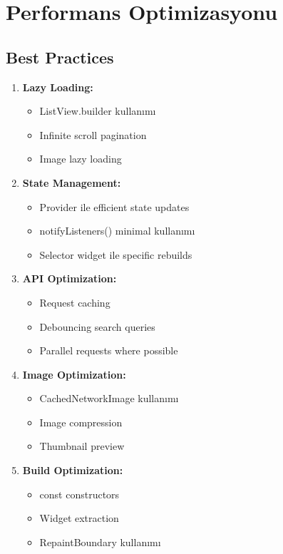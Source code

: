 \documentclass[12pt,a4paper]{article}
\begin{document}
\newpage

\section{Performans Optimizasyonu}

\subsection{Best Practices}

\begin{enumerate}
    \item \textbf{Lazy Loading:}
    \begin{itemize}
        \item ListView.builder kullanımı
        \item Infinite scroll pagination
        \item Image lazy loading
    \end{itemize}
    
    \item \textbf{State Management:}
    \begin{itemize}
        \item Provider ile efficient state updates
        \item notifyListeners() minimal kullanımı
        \item Selector widget ile specific rebuilds
    \end{itemize}
    
    \item \textbf{API Optimization:}
    \begin{itemize}
        \item Request caching
        \item Debouncing search queries
        \item Parallel requests where possible
    \end{itemize}
    
    \item \textbf{Image Optimization:}
    \begin{itemize}
        \item CachedNetworkImage kullanımı
        \item Image compression
        \item Thumbnail preview
    \end{itemize}
    
    \item \textbf{Build Optimization:}
    \begin{itemize}
        \item const constructors
        \item Widget extraction
        \item RepaintBoundary kullanımı
    \end{itemize}
\end{enumerate}
\end{document}
